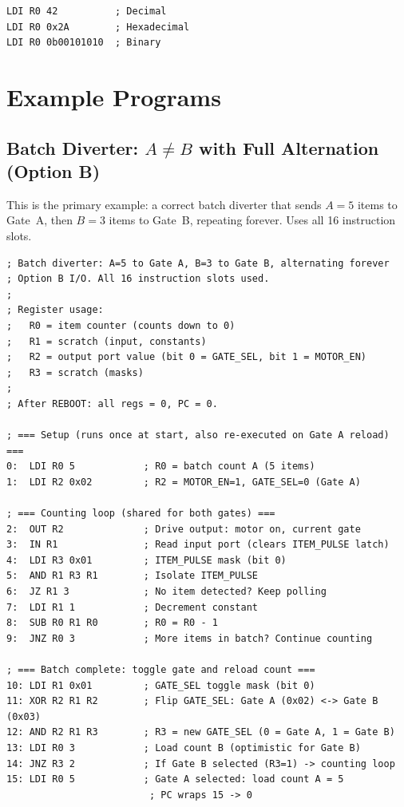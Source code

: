 \documentclass[11pt,a4paper]{article}
\begin{document}
\begin{lstlisting}
LDI R0 42          ; Decimal
LDI R0 0x2A        ; Hexadecimal
LDI R0 0b00101010  ; Binary
\end{lstlisting}

\section{Example Programs}

\subsection{Batch Diverter: $A \neq B$ with Full Alternation (Option B)}

This is the primary example: a correct batch diverter that sends $A=5$ items to Gate~A, then $B=3$ items to Gate~B, repeating forever. Uses all 16 instruction slots.

\begin{lstlisting}
; Batch diverter: A=5 to Gate A, B=3 to Gate B, alternating forever
; Option B I/O. All 16 instruction slots used.
;
; Register usage:
;   R0 = item counter (counts down to 0)
;   R1 = scratch (input, constants)
;   R2 = output port value (bit 0 = GATE_SEL, bit 1 = MOTOR_EN)
;   R3 = scratch (masks)
;
; After REBOOT: all regs = 0, PC = 0.

; === Setup (runs once at start, also re-executed on Gate A reload) ===
0:  LDI R0 5            ; R0 = batch count A (5 items)
1:  LDI R2 0x02         ; R2 = MOTOR_EN=1, GATE_SEL=0 (Gate A)

; === Counting loop (shared for both gates) ===
2:  OUT R2              ; Drive output: motor on, current gate
3:  IN R1               ; Read input port (clears ITEM_PULSE latch)
4:  LDI R3 0x01         ; ITEM_PULSE mask (bit 0)
5:  AND R1 R3 R1        ; Isolate ITEM_PULSE
6:  JZ R1 3             ; No item detected? Keep polling
7:  LDI R1 1            ; Decrement constant
8:  SUB R0 R1 R0        ; R0 = R0 - 1
9:  JNZ R0 3            ; More items in batch? Continue counting

; === Batch complete: toggle gate and reload count ===
10: LDI R1 0x01         ; GATE_SEL toggle mask (bit 0)
11: XOR R2 R1 R2        ; Flip GATE_SEL: Gate A (0x02) <-> Gate B (0x03)
12: AND R2 R1 R3        ; R3 = new GATE_SEL (0 = Gate A, 1 = Gate B)
13: LDI R0 3            ; Load count B (optimistic for Gate B)
14: JNZ R3 2            ; If Gate B selected (R3=1) -> counting loop
15: LDI R0 5            ; Gate A selected: load count A = 5
                         ; PC wraps 15 -> 0
\end{lstlisting}
\end{document}

